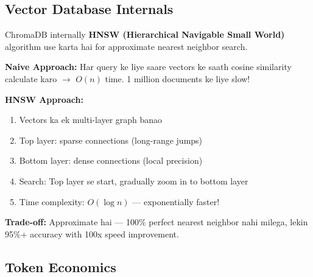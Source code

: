 \documentclass[12pt, a4paper]{article}
\begin{document}
\subsection{Vector Database Internals}

\begin{conceptbox}[title={\faIcon{brain} ~ChromaDB HNSW Index}]
ChromaDB internally \textbf{HNSW (Hierarchical Navigable Small World)} algorithm use karta hai for approximate nearest neighbor search.

\textbf{Naive Approach:} Har query ke liye saare vectors ke saath cosine similarity calculate karo $\rightarrow$ $O(n)$ time. 1 million documents ke liye slow!

\textbf{HNSW Approach:}
\begin{enumerate}
\item Vectors ka ek multi-layer graph banao
\item Top layer: sparse connections (long-range jumps)
\item Bottom layer: dense connections (local precision)
\item Search: Top layer se start, gradually zoom in to bottom layer
\item Time complexity: $O(\log n)$ --- exponentially faster!
\end{enumerate}

\textbf{Trade-off:} Approximate hai --- 100\% perfect nearest neighbor nahi milega, lekin 95\%+ accuracy with 100x speed improvement.
\end{conceptbox}

\subsection{Token Economics}
\end{document}
